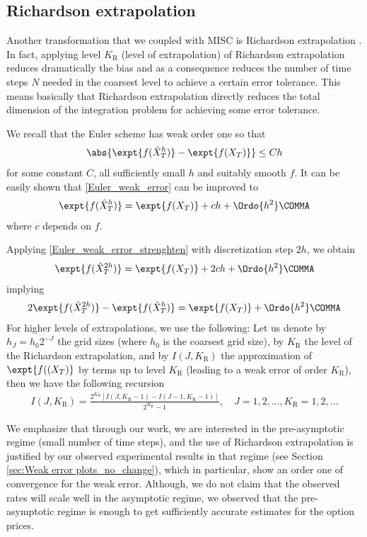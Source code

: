 \subsection{Richardson extrapolation}\label{sec:Richardson extrapolation}
Another transformation that we coupled with MISC is Richardson extrapolation \cite{talay1990expansion}. In fact, applying level $K_\text{R}$ (level of extrapolation) of Richardson extrapolation reduces dramatically the bias and as a consequence reduces the  number of time steps $N$ needed in the coarsest level to achieve a certain error tolerance. This means basically that Richardson extrapolation directly reduces  the total dimension of the integration problem for achieving some error tolerance.

We  recall that the Euler scheme has weak order one so that
\begin{align}\label{Euler_weak_error}
	\abs{\expt{f(\hat{X}_T^h)}-\expt{f(X_T)} }  \leq C h
\end{align}
for some constant $C$, all sufficiently small $h$ and suitably smooth $f$. It can be easily  shown that  \eqref{Euler_weak_error} can be improved to
\begin{align}\label{Euler_weak_error_strenghten}
	\expt{f(\hat{X}_T^h)}= \expt{f(X_T)} + c h +\Ordo{h^2} \COMMA
\end{align}
where $c$ depends on $f$. 

Applying \eqref{Euler_weak_error_strenghten} with discretization step $2h$, we  obtain
\begin{align*}
	\expt{f(\hat{X}_T^{2h})}= \expt{f(X_T)} + 2 c h +\Ordo{h^2} \COMMA
\end{align*}
implying
\begin{align*}
	2 \expt{f(\hat{X}_T^{2h})}- \expt{f(\hat{X}_T^{h})} =\expt{f(X_T)} + \Ordo{h^2} \COMMA
\end{align*}
For higher levels of extrapolations, we use the following: Let us denote by $h_J=h_0 2^{-J}$ the grid sizes (where $h_0$ is the coarsest grid size), by $K_\text{R}$ the level of the Richardson extrapolation, and by $I(J,K_\text{R})$ the approximation of $\expt{f((X_T)}$ by terms up to level $K_\text{R}$ (leading to a weak error of order $K_\text{R}$), then we have the following recursion 
\begin{align*}
I(J,K_\text{R})=\frac{2^{K_\text{R}}\left[I(J,K_\text{R}-1)-I(J-1,K_\text{R}-1)\right]}{2^{K_\text{R}}-1},\quad J=1,2,\dots, K_\text{R}=1,2,\dots
\end{align*}
\begin{remark}
We emphasize that through our work, we are interested in the pre-asymptotic regime (small number of time steps), and the use of Richardson extrapolation is justified by our observed experimental results in that regime (see Section \ref{sec:Weak error plots_no_change}),  which in particular, show an order one of convergence for the weak error. Although, we do not claim that the observed rates will scale well in the asymptotic regime, we observed that the pre-asymptotic regime is enough to get sufficiently accurate estimates for the option prices. 
\end{remark}

